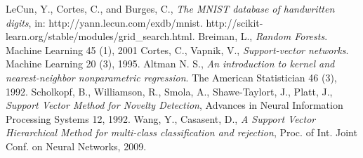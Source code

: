 \documentclass{article}
\begin{document}
\newpage
\begin{thebibliography}{9}
	 LeCun, Y., Cortes, C., and Burges, C., \emph{The MNIST database of handwritten digits}, in: http://yann.lecun.com/exdb/mnist.
	 http://scikit-learn.org/stable/modules/grid\_search.html.
	 Breiman, L., \emph{Random Forests}. Machine Learning 45 (1), 2001
	 Cortes, C., Vapnik, V., \emph{Support-vector networks}. Machine Learning 20 (3), 1995.	
	 Altman N. S., \emph{An introduction to kernel and nearest-neighbor nonparametric regression}. The American Statistician 46 (3), 1992.
     Scholkopf, B., Williamson, R., Smola, A., Shawe-Taylort, J., Platt, J., \emph{Support Vector Method for Novelty Detection}, Advances in Neural Information Processing Systems 12, 1992. 
     Wang, Y., Casasent, D., \emph{A Support Vector Hierarchical Method for multi-class classification and rejection}, Proc. of Int. Joint Conf. on Neural Networks, 2009.


\end{thebibliography}
\end{document}
